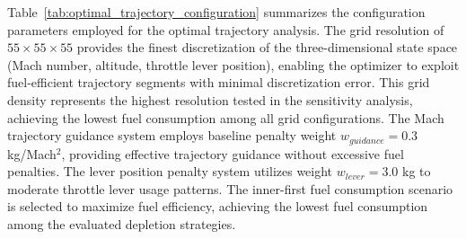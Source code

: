 Table~\ref{tab:optimal_trajectory_configuration} summarizes the configuration parameters employed for the optimal trajectory analysis. The grid resolution of $55 \times 55 \times 55$ provides the finest discretization of the three-dimensional state space (Mach number, altitude, throttle lever position), enabling the optimizer to exploit fuel-efficient trajectory segments with minimal discretization error. This grid density represents the highest resolution tested in the sensitivity analysis, achieving the lowest fuel consumption among all grid configurations. The Mach trajectory guidance system employs baseline penalty weight $w_{guidance} = 0.3$ kg/Mach$^2$, providing effective trajectory guidance without excessive fuel penalties. The lever position penalty system utilizes weight $w_{lever} = 3.0$ kg to moderate throttle lever usage patterns. The inner-first fuel consumption scenario is selected to maximize fuel efficiency, achieving the lowest fuel consumption among the evaluated depletion strategies.
